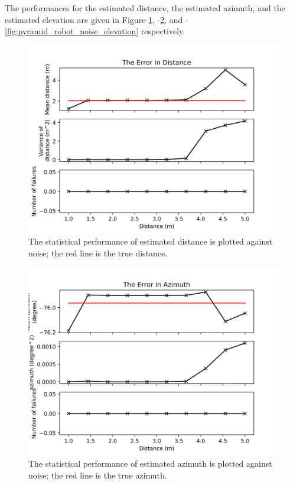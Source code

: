 \documentclass[notitlepage]{report}
\begin{document}
The performances for the estimated distance, the estimated azimuth, and the estimated elevation are given in Figure-\ref{fig:pyramid_robot_noise_distance}, -\ref{fig:pyramid_robot_noise_azimuth}, and -\ref{fig:pyramid_robot_noise_elevation} respectively.


\begin{figure}[H]
\includegraphics[width=1\textwidth]{../Python/pyramid_robot/noise/distance.png}
\centering
\caption{The statistical performance of estimated distance is plotted against noise; the red line is the true distance.}
\label{fig:pyramid_robot_noise_distance}
\centering
\end{figure}

\begin{figure}[H]
\includegraphics[width=1\textwidth]{../Python/pyramid_robot/noise/azimuth.png}
\centering
\caption{The statistical performance of estimated azimuth is plotted against noise; the red line is the true azimuth.}
\label{fig:pyramid_robot_noise_azimuth}
\centering
\end{figure}
\end{document}
